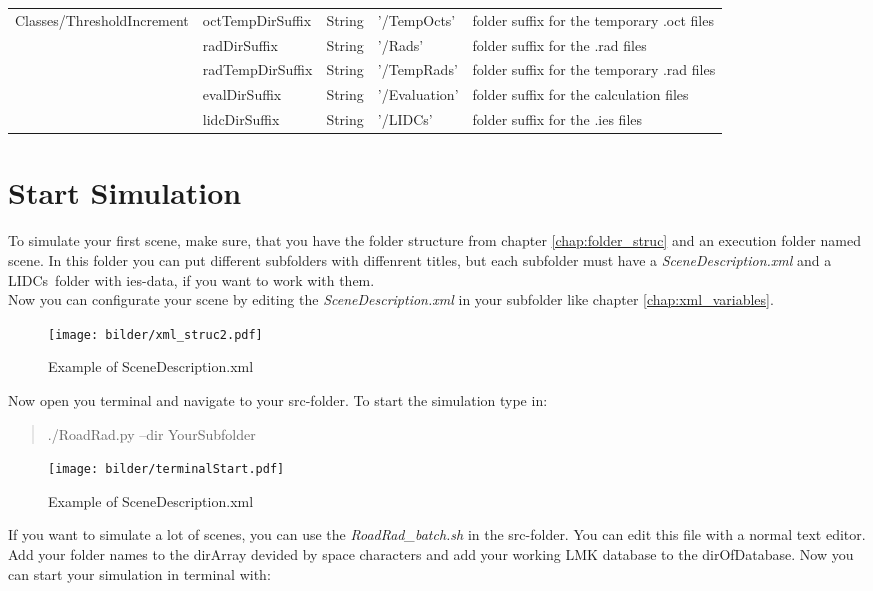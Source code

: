 \documentclass[10pt,a4paper]{report}
\begin{document}
\begin{landscape}
\begin{longtable}{lllp{4cm}p{6cm}}
		Classes/ThresholdIncrement & octTempDirSuffix & String & '/TempOcts' & folder suffix for the temporary .oct files \\
    	& radDirSuffix & String & '/Rads' & folder suffix for the .rad files \\
    	& radTempDirSuffix & String & '/TempRads' & folder suffix for the temporary .rad files \\
    	& evalDirSuffix & String & '/Evaluation' & folder suffix for the calculation files \\
    	& lidcDirSuffix & String & '/LIDCs' & folder suffix for the .ies files \\
	
	\end{longtable} 
\end{landscape}

\chapter{Start Simulation}

To simulate your first scene, make sure, that you have the folder structure from chapter \ref{chap:folder_struc} and an execution folder named \glqq scene\grqq. In this folder you can put different subfolders with diffenrent titles, but each subfolder must have a \textit{SceneDescription.xml} and a \glqq LIDCs\grqq\ folder with ies-data, if you want to work with them.\\
Now you can configurate your scene by editing the \textit{SceneDescription.xml} in your subfolder like chapter \ref{chap:xml_variables}.

\begin{figure}[H]
\texttt{[image: bilder/xml\_struc2.pdf]} 
\caption{Example of SceneDescription.xml}
\end{figure}

Now open you terminal and navigate to your src-folder. To start the simulation type in:

\begin{quote}
./RoadRad.py --dir YourSubfolder
\end{quote}

\begin{figure}[H]
\centering
\texttt{[image: bilder/terminalStart.pdf]} 
\caption{Example of SceneDescription.xml}
\end{figure}

If you want to simulate a lot of scenes, you can use the \textit{RoadRad\_batch.sh} in the src-folder. You can edit this file with a normal text editor. Add your folder names to the dirArray devided by space characters and add your working LMK database to the dirOfDatabase. Now you can start your simulation in terminal with:
\end{document}
